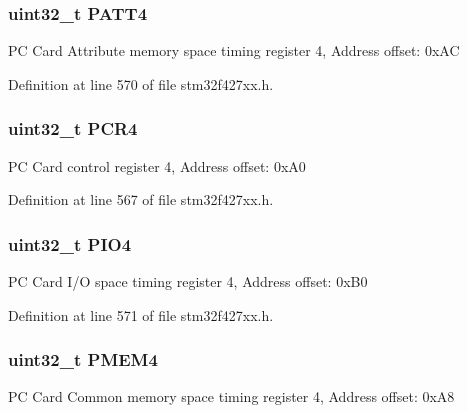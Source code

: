 \subsubsection[{\texorpdfstring{P\+A\+T\+T4}{PATT4}}]{ uint32\+\_\+t P\+A\+T\+T4}\hypertarget{struct_f_m_c___bank4___type_def_a955cad1aab7fb2d5b6e216cb29b5e7e2}{}\label{struct_f_m_c___bank4___type_def_a955cad1aab7fb2d5b6e216cb29b5e7e2}
PC Card Attribute memory space timing register 4, Address offset\+: 0x\+AC 

Definition at line 570 of file stm32f427xx.\+h.

\subsubsection[{\texorpdfstring{P\+C\+R4}{PCR4}}]{ uint32\+\_\+t P\+C\+R4}\hypertarget{struct_f_m_c___bank4___type_def_a2f02e7acfbd7e549ede84633215eb6a1}{}\label{struct_f_m_c___bank4___type_def_a2f02e7acfbd7e549ede84633215eb6a1}
PC Card control register 4, Address offset\+: 0x\+A0 

Definition at line 567 of file stm32f427xx.\+h.

\subsubsection[{\texorpdfstring{P\+I\+O4}{PIO4}}]{ uint32\+\_\+t P\+I\+O4}\hypertarget{struct_f_m_c___bank4___type_def_ac53cd7a08093a4ae8f4de4bcff67a64f}{}\label{struct_f_m_c___bank4___type_def_ac53cd7a08093a4ae8f4de4bcff67a64f}
PC Card I/O space timing register 4, Address offset\+: 0x\+B0 

Definition at line 571 of file stm32f427xx.\+h.

\subsubsection[{\texorpdfstring{P\+M\+E\+M4}{PMEM4}}]{ uint32\+\_\+t P\+M\+E\+M4}\hypertarget{struct_f_m_c___bank4___type_def_a3f82cc749845fb0dd7dfa8121d96b663}{}\label{struct_f_m_c___bank4___type_def_a3f82cc749845fb0dd7dfa8121d96b663}
PC Card Common memory space timing register 4, Address offset\+: 0x\+A8 

